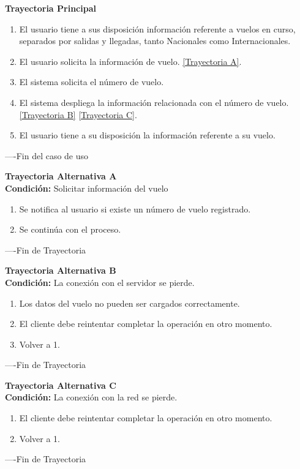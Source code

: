 \begin{flushleft}
	\textbf{Trayectoria Principal}\\
	\begin{enumerate}
		\item El usuario tiene a sus disposición información referente a vuelos en curso, separados por salidas y llegadas, tanto Nacionales 
		como Internacionales.
		\item El usuario solicita la información de vuelo. \hyperlink{TrayectoriaA_CU-U-09}{[Trayectoria A]}.
		\item El sistema solicita el número de vuelo.
		\item El sistema despliega la información relacionada con el número de vuelo. \hyperlink{TrayectoriaB_CU-U-09}{[Trayectoria B]} \hyperlink{TrayectoriaC_CU-U-09}{[Trayectoria C]}.
		\item El usuario tiene a su disposición la información referente a su vuelo.
	\end{enumerate}
\end{flushleft}
----Fin del caso de uso

\begin{flushleft}
	\hypertarget{TrayectoriaA_CU-U-09}{}
	\textbf{Trayectoria Alternativa A}\\
	\textbf{Condición:} Solicitar información del vuelo \\
	\begin{enumerate}
		\item Se notifica al usuario si existe un número de vuelo registrado.
		\item Se continúa con el proceso.
	\end{enumerate}
\end{flushleft}
----Fin de Trayectoria

\begin{flushleft}
	\hypertarget{TrayectoriaB_CU-U-09}{}
	\textbf{Trayectoria Alternativa B}\\
	\textbf{Condición:} La conexión con el servidor se pierde. \\
	\begin{enumerate}
		\item Los datos del vuelo no pueden ser cargados correctamente. 
		\item El cliente debe reintentar completar la operación en otro momento. 
		\item Volver a 1.
	\end{enumerate}
\end{flushleft}
----Fin de Trayectoria

\begin{flushleft}
	\hypertarget{TrayectoriaC_CU-U-09}{}
	\textbf{Trayectoria Alternativa C}\\
	\textbf{Condición:} La conexión con la red se pierde. \\
	\begin{enumerate}
		\item El cliente debe reintentar completar la operación en otro momento. 
		\item Volver a 1.
	\end{enumerate}
\end{flushleft}
----Fin de Trayectoria
\newpage